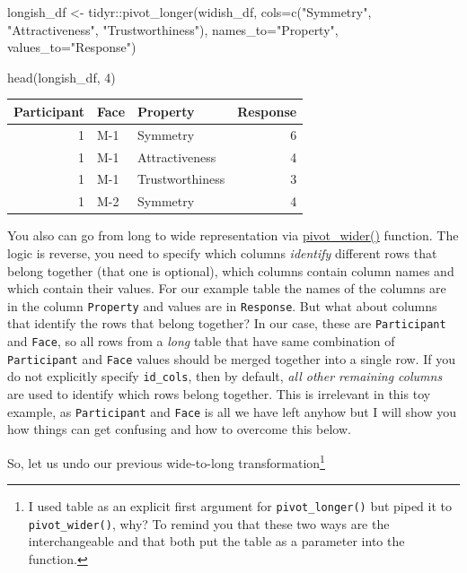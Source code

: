 \documentclass[
]{book}
\newenvironment{Shaded}{\begin{snugshade}}{\end{snugshade}}
\newcommand{\AttributeTok}[1]{\textcolor[rgb]{0.77,0.63,0.00}{#1}}
\newcommand{\DecValTok}[1]{\textcolor[rgb]{0.00,0.00,0.81}{#1}}
\newcommand{\FunctionTok}[1]{\textcolor[rgb]{0.00,0.00,0.00}{#1}}
\newcommand{\NormalTok}[1]{#1}
\newcommand{\OtherTok}[1]{\textcolor[rgb]{0.56,0.35,0.01}{#1}}
\newcommand{\SpecialCharTok}[1]{\textcolor[rgb]{0.00,0.00,0.00}{#1}}
\newcommand{\StringTok}[1]{\textcolor[rgb]{0.31,0.60,0.02}{#1}}
\begin{document}
\begin{Shaded}
\begin{Highlighting}[]
\NormalTok{longish\_df }\OtherTok{\textless{}{-}} 
\NormalTok{  tidyr}\SpecialCharTok{::}\FunctionTok{pivot\_longer}\NormalTok{(widish\_df, }
                      \AttributeTok{cols=}\FunctionTok{c}\NormalTok{(}\StringTok{"Symmetry"}\NormalTok{, }\StringTok{"Attractiveness"}\NormalTok{, }\StringTok{"Trustworthiness"}\NormalTok{),}
                      \AttributeTok{names\_to=}\StringTok{"Property"}\NormalTok{,}
                      \AttributeTok{values\_to=}\StringTok{"Response"}\NormalTok{)}
                      
\FunctionTok{head}\NormalTok{(longish\_df, }\DecValTok{4}\NormalTok{)}
\end{Highlighting}
\end{Shaded}

\begin{tabular}{r|l|l|r}
\hline
Participant & Face & Property & Response\\
\hline
1 & M-1 & Symmetry & 6\\
\hline
1 & M-1 & Attractiveness & 4\\
\hline
1 & M-1 & Trustworthiness & 3\\
\hline
1 & M-2 & Symmetry & 4\\
\hline
\end{tabular}

You also can go from long to wide representation via \href{https://tidyr.tidyverse.org/reference/pivot_wider.html}{pivot\_wider()} function. The logic is reverse, you need to specify which columns \emph{identify} different rows that belong together (that one is optional), which columns contain column names and which contain their values. For our example table the names of the columns are in the column \texttt{Property} and values are in \texttt{Response}. But what about columns that identify the rows that belong together? In our case, these are \texttt{Participant} and \texttt{Face}, so all rows from a \emph{long} table that have same combination of \texttt{Participant} and \texttt{Face} values should be merged together into a single row. If you do not explicitly specify \texttt{id\_cols}, then by default, \emph{all other remaining columns} are used to identify which rows belong together. This is irrelevant in this toy example, as \texttt{Participant} and \texttt{Face} is all we have left anyhow but I will show you how things can get confusing and how to overcome this below.

So, let us undo our previous wide-to-long transformation\footnote{I used table as an explicit first argument for \texttt{pivot\_longer()} but piped it to \texttt{pivot\_wider()}, why? To remind you that these two ways are the interchangeable and that both put the table as a parameter into the function.}
\end{document}
